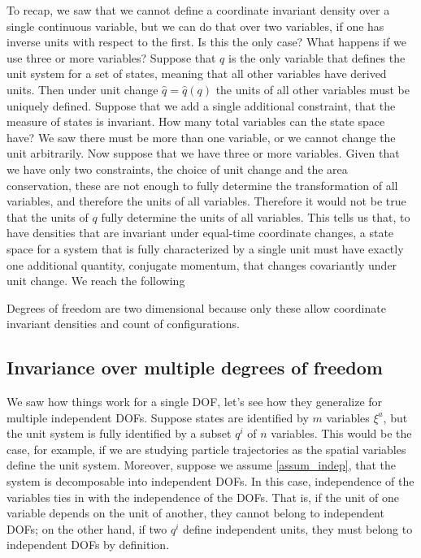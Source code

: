 To recap, we saw that we cannot define a coordinate invariant density over a single continuous variable, but we can do that over two variables, if one has inverse units with respect to the first. Is this the only case? What happens if we use three or more variables? Suppose that $q$ is the only variable that defines the unit system for a set of states, meaning that all other variables have derived units. Then under unit change $\hat{q} = \hat{q}(q)$ the units of all other variables must be uniquely defined. Suppose that we add a single additional constraint, that the measure of states is invariant. How many total variables can the state space have? We saw there must be more than one variable, or we cannot change the unit arbitrarily. Now suppose that we have three or more variables. Given that we have only two constraints, the choice of unit change and the area conservation, these are not enough to fully determine the transformation of all variables, and therefore the units of all variables. Therefore it would not be true that the units of $q$ fully determine the units of all variables. This tells us that, to have densities that are invariant under equal-time coordinate changes, a state space for a system that is fully characterized by a single unit must have exactly one additional quantity, conjugate momentum, that changes covariantly under unit change. We reach the following
\begin{insight}
	Degrees of freedom are two dimensional because only these allow coordinate invariant densities and count of configurations.
\end{insight}


\subsection{Invariance over multiple degrees of freedom}


We saw how things work for a single DOF, let's see how they generalize for multiple independent DOFs. Suppose states are identified by $m$ variables $\xi^a$, but the unit system is fully identified by a subset $q^i$ of $n$ variables. This would be the case, for example, if we are studying particle trajectories as the spatial variables define the unit system. Moreover, suppose we assume \ref{assum_indep}, that the system is decomposable into independent DOFs. In this case, independence of the variables ties in with the independence of the DOFs. That is, if the unit of one variable depends on the unit of another, they cannot belong to independent DOFs; on the other hand, if two $q^i$ define independent units, they must belong to independent DOFs by definition.

